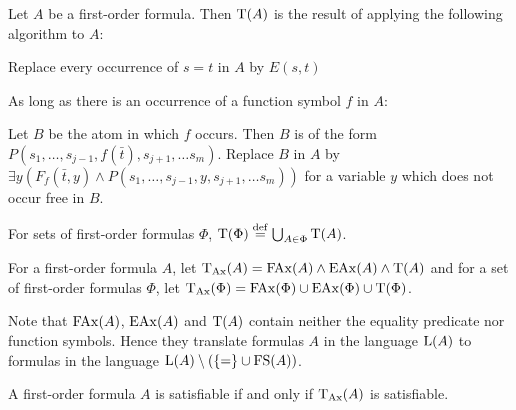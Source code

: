 \begin{defi}
	\label{def:trans}
	Let $A$ be a first-order formula. Then $\mathrm{T}(A)$ is the result of applying the following algorithm to $A$:
	\begin{compactenum}
	\item Replace every occurrence of $s=t$ in $A$ by $E(s, t)$
	\label{def:trans_step1}
	\item As long as there is an occurrence of a function symbol $f$ in $A$:
	\label{def:trans_step2}

		Let $B$ be the atom in which $f$ occurs.
		\newline Then $B$ is of the form $P(s_1, \ldots, s_{j-1}, f(\bar t),\allowbreak s_{j+1}, \ldots s_m)$.
		\newline Replace $B$ in $A$ by $\exists y (F_f(\bar t, y) \land P(s_1, \ldots, s_{j-1}, y, s_{j+1}, \ldots s_m))$ for a variable $y$ which does not occur free in $B$.
	\end{compactenum}

	For sets of first-order formulas $\Phi$, $\mathrm{T}(\Phi) \stackrel{\mathrm{def}}{=} \bigcup_{A\in\Phi} \mathrm{T}(A)$.
\end{defi}

\begin{defi}
For a first-order formula $A$, let $\mathrm{T}_{\mathrm{Ax}}(A) = \mathrm{FAx}(A) \land \mathrm{EAx}(A) \land \mathrm{T}(A)$ and for a set of first-order formulas $\Phi$, let $\mathrm{T}_{\mathrm{Ax}}(\Phi) = \mathrm{FAx}(\Phi) \cup \mathrm{EAx}(\Phi) \cup \mathrm{T}(\Phi)$.
\end{defi}


Note that $\mathrm{FAx}(A)$, $\mathrm{EAx}(A)$ and $\mathrm{T}(A)$ contain neither the equality predicate nor function symbols.
Hence they translate formulas $A$ in the language $\mathrm{L}(A)$ to formulas in the language $\mathrm{L}(A) \setminus (\{=\} \cup \mathrm{FS}(A))$.



\begin{prop}
	A first-order formula $A$ is satisfiable if and only if $\mathrm{T}_{\mathrm{Ax}}(A)$ is satisfiable.
	\label{prop:trans_sat_equiv}
\end{prop}


